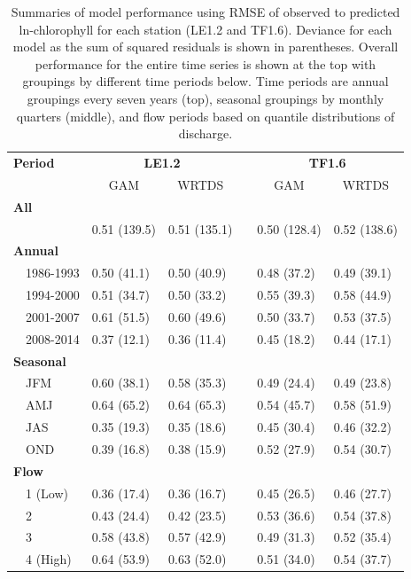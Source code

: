 \documentclass[letterpaper,12pt,oneside]{article}\usepackage[]{graphicx}\usepackage[]{color}
\begin{document}
\begin{table}[!tbp]
\caption{Summaries of model performance using \ac{RMSE} of observed to predicted ln-chlorophyll for each station (LE1.2 and TF1.6).  Deviance for each model as the sum of squared residuals is shown in parentheses. Overall performance for the entire time series is shown at the top with groupings by different time periods below.  Time periods are annual groupings every seven years (top), seasonal groupings by monthly quarters (middle), and flow periods based on quantile distributions of discharge.\label{tab:perftoobs}} 
\begin{center}
\begin{tabular}{lllcll}
\hline\hline
\multicolumn{1}{l}{\bfseries Period}&\multicolumn{2}{c}{\bfseries LE1.2}&\multicolumn{1}{c}{\bfseries }&\multicolumn{2}{c}{\bfseries TF1.6}\tabularnewline
\cline{2-3} \cline{5-6}
\multicolumn{1}{l}{}&\multicolumn{1}{c}{GAM}&\multicolumn{1}{c}{WRTDS}&\multicolumn{1}{c}{}&\multicolumn{1}{c}{GAM}&\multicolumn{1}{c}{WRTDS}\tabularnewline
\hline
{\bfseries All}&&&&&\tabularnewline
~~&0.51 (139.5)&0.51 (135.1)&&0.50 (128.4)&0.52 (138.6)\tabularnewline
\hline
{\bfseries Annual}&&&&&\tabularnewline
~~1986-1993&0.50 (41.1)&0.50 (40.9)&&0.48 (37.2)&0.49 (39.1)\tabularnewline
~~1994-2000&0.51 (34.7)&0.50 (33.2)&&0.55 (39.3)&0.58 (44.9)\tabularnewline
~~2001-2007&0.61 (51.5)&0.60 (49.6)&&0.50 (33.7)&0.53 (37.5)\tabularnewline
~~2008-2014&0.37 (12.1)&0.36 (11.4)&&0.45 (18.2)&0.44 (17.1)\tabularnewline
\hline
{\bfseries Seasonal}&&&&&\tabularnewline
~~JFM&0.60 (38.1)&0.58 (35.3)&&0.49 (24.4)&0.49 (23.8)\tabularnewline
~~AMJ&0.64 (65.2)&0.64 (65.3)&&0.54 (45.7)&0.58 (51.9)\tabularnewline
~~JAS&0.35 (19.3)&0.35 (18.6)&&0.45 (30.4)&0.46 (32.2)\tabularnewline
~~OND&0.39 (16.8)&0.38 (15.9)&&0.52 (27.9)&0.54 (30.7)\tabularnewline
\hline
{\bfseries Flow}&&&&&\tabularnewline
~~1 (Low)&0.36 (17.4)&0.36 (16.7)&&0.45 (26.5)&0.46 (27.7)\tabularnewline
~~2&0.43 (24.4)&0.42 (23.5)&&0.53 (36.6)&0.54 (37.8)\tabularnewline
~~3&0.58 (43.8)&0.57 (42.9)&&0.49 (31.3)&0.52 (35.4)\tabularnewline
~~4 (High)&0.64 (53.9)&0.63 (52.0)&&0.51 (34.0)&0.54 (37.7)\tabularnewline
\hline
\end{tabular}\end{center}

\end{table}
\end{document}

